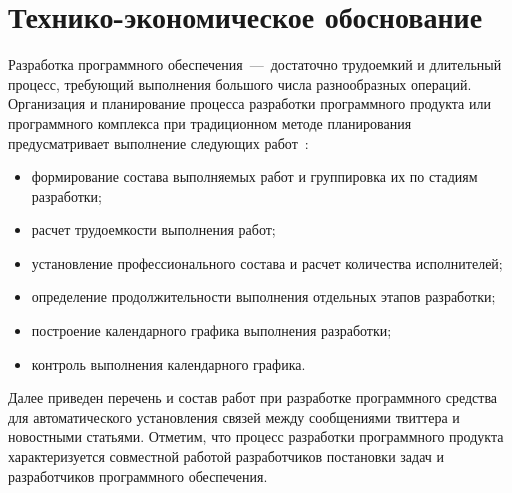 \section{Технико-экономическое обоснование}
    Разработка программного обеспечения~---~достаточно трудоемкий и длительный процесс, требующий выполнения большого числа разнообразных операций.
    Организация и планирование процесса разработки программного продукта или программного комплекса при традиционном методе планирования предусматривает выполнение следующих работ~\cite{economic_smirnov}:
    \begin{itemize}
        \item формирование состава выполняемых работ и группировка их по стадиям разработки;
        \item расчет трудоемкости выполнения работ;
        \item установление профессионального состава и расчет количества исполнителей;
        \item определение продолжительности выполнения отдельных этапов разработки;
        \item построение календарного графика выполнения разработки;
        \item контроль выполнения календарного графика.
    \end{itemize}

    Далее приведен перечень и состав работ при разработке программного средства для автоматического установления связей между сообщениями твиттера и новостными статьями.
    Отметим, что процесс разработки программного продукта характеризуется совместной работой разработчиков постановки задач и разработчиков программного обеспечения.

